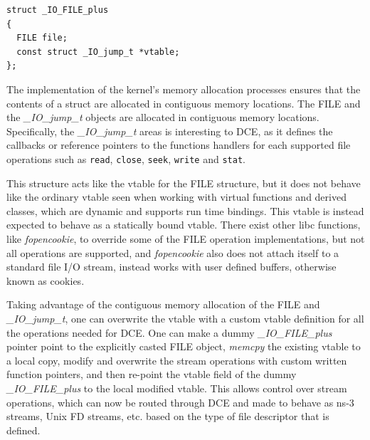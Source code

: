 \documentclass{sig-alternate}
\begin{document}
\begin{lstlisting}[style=CStyle]     
struct _IO_FILE_plus
{
  FILE file;
  const struct _IO_jump_t *vtable;
};
\end{lstlisting}

The implementation of the kernel's memory allocation processes ensures that the contents of a struct are allocated in contiguous memory locations. 
The FILE and the \textit{\_IO\_jump\_t} objects are allocated in contiguous memory locations. Specifically, the 
\textit{\_IO\_jump\_t} areas is interesting to DCE, as it defines the callbacks or reference pointers to the functions handlers for each supported file 
operations such as \texttt{read}, \texttt{close}, \texttt{seek}, \texttt{write} and \texttt{stat}.

This structure acts like the vtable for the FILE structure, but it does not behave like the ordinary vtable seen when working with virtual functions 
and derived classes, which are dynamic and supports run time bindings. This vtable is instead expected to behave as a statically bound vtable.  There exist 
other libc functions, like \textit{fopencookie}, to override some of the FILE operation implementations, but not all operations are supported, and 
\textit{fopencookie} also does not attach itself to a standard file I/O stream, 
instead works  with user defined buffers, otherwise known as cookies. 

Taking advantage of the contiguous memory allocation of the FILE and \textit{\_IO\_jump\_t}, one can overwrite the vtable with a custom vtable definition for all
the operations needed for DCE. One can make a dummy \textit{\_IO\_FILE\_plus} 
pointer point to the explicitly casted FILE object, \textit{memcpy} the existing vtable to a local copy, modify and overwrite the stream operations with
custom written function pointers, and then re-point the vtable field of the dummy \textit{\_IO\_FILE\_plus} to the local modified vtable.  This allows
control over stream operations, which can now be routed through DCE and made to behave as ns-3 streams, Unix FD streams, etc. based on the type of file 
descriptor that is defined.
\end{document}
